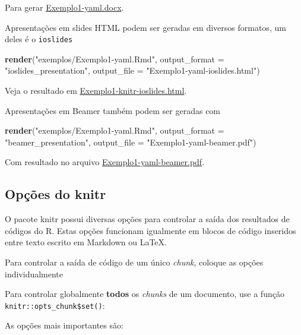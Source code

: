 \documentclass[10pt,a4paper]{book}
\newenvironment{Shaded}{\begin{snugshade}}{\end{snugshade}}
\newcommand{\KeywordTok}[1]{\textcolor[rgb]{0.13,0.29,0.53}{\textbf{#1}}}
\newcommand{\DataTypeTok}[1]{\textcolor[rgb]{0.13,0.29,0.53}{#1}}
\newcommand{\StringTok}[1]{\textcolor[rgb]{0.31,0.60,0.02}{#1}}
\newcommand{\NormalTok}[1]{#1}
\begin{document}
Para gerar \href{exemplos/Exemplo1-knitr.docx}{Exemplo1-yaml.docx}.

Apresentações em slides HTML podem ser geradas em diversos formatos, um
deles é o \texttt{ioslides}

\begin{Shaded}
\begin{Highlighting}[]
\KeywordTok{render}\NormalTok{(}\StringTok{"exemplos/Exemplo1-yaml.Rmd"}\NormalTok{,}
       \DataTypeTok{output_format =} \StringTok{"ioslides_presentation"}\NormalTok{,}
       \DataTypeTok{output_file =} \StringTok{"Exemplo1-yaml-ioslides.html"}\NormalTok{)}
\end{Highlighting}
\end{Shaded}

Veja o resultado em
\href{exemplos/Exemplo1-knitr-ioslides.html}{Exemplo1-knitr-ioslides.html}.

Apresentações em Beamer também podem ser geradas com

\begin{Shaded}
\begin{Highlighting}[]
\KeywordTok{render}\NormalTok{(}\StringTok{"exemplos/Exemplo1-yaml.Rmd"}\NormalTok{,}
       \DataTypeTok{output_format =} \StringTok{"beamer_presentation"}\NormalTok{,}
       \DataTypeTok{output_file =} \StringTok{"Exemplo1-yaml-beamer.pdf"}\NormalTok{)}
\end{Highlighting}
\end{Shaded}

Com resultado no arquivo
\href{exemplos/Exemplo1-yaml-beamer.pdf}{Exemplo1-yaml-beamer.pdf}.

\subsection{Opções do knitr}\label{opuxe7uxf5es-do-knitr}

O pacote knitr possui diversas opções para controlar a saída dos
resultados de códigos do R. Estas opções funcionam igualmente em blocos
de código inseridos entre texto escrito em Markdown ou LaTeX.

Para controlar a saída de código de um único \emph{chunk}, coloque as
opções individualmente

Para controlar globalmente \textbf{todos} os \emph{chunks} de um
documento, use a função \texttt{knitr::opts\_chunk\$set()}:

As opções mais importantes são:
\end{document}
